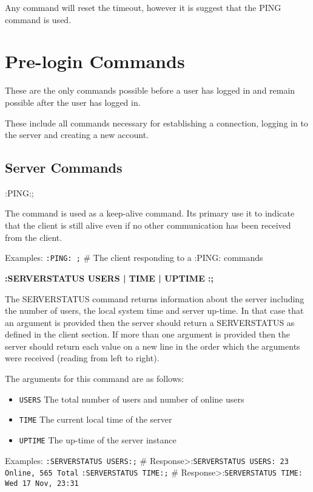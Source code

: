Any command will reset the timeout, however it is suggest that the PING command is used.
\section{Pre-login Commands}

These are the only commands possible before a user has logged in and remain possible after the user has logged in.

These include all commands necessary for establishing a connection, logging in to the server and creating a new account.
\subsection{Server Commands}

:PING:;

The command is used as a keep-alive command. Its primary use it to indicate that the client is still alive even if no other communication has been received from the client. 

Examples:
\texttt{:PING: ;}				# The client responding to a :PING: commands

{\bf :SERVERSTATUS { USERS | TIME | UPTIME }:;}

The SERVERSTATUS command returns information about the server including the number of users, the local system time and server up-time. 
In that case that an argument is provided then the server should return a SERVERSTATUS as defined in the client section. If more than one argument is provided then the server should return each value on a new line in the order which the arguments were received (reading from left to right).

The arguments for this command are as follows:

\begin{itemize}

\item \texttt{USERS}
The total number of users and number of online users

\item \texttt{TIME}
The current local time of the server

\item \texttt{UPTIME}
The up-time of the server instance

\end{itemize}

Examples:
\texttt{:SERVERSTATUS USERS:;}	# Response>:\texttt{SERVERSTATUS USERS: 23 Online, 565 Total}
\texttt{:SERVERSTATUS TIME:;}	# Response>:\texttt{SERVERSTATUS TIME: Wed 17 Nov, 23:31}

